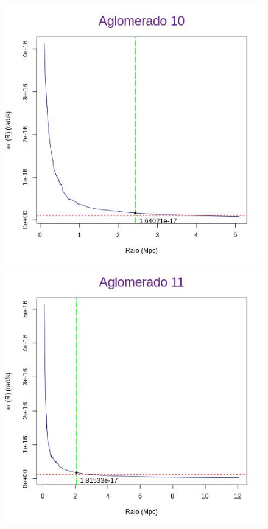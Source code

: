 \begin{anexosenv}
\begin{figure}[H]
\begin{center}
\includegraphics[scale=.3]{04-figuras/selec20/perfil10}
\includegraphics[scale=.3]{04-figuras/selec20/perfil11}\hfill

\end{center}
\end{figure}
\end{anexosenv}

